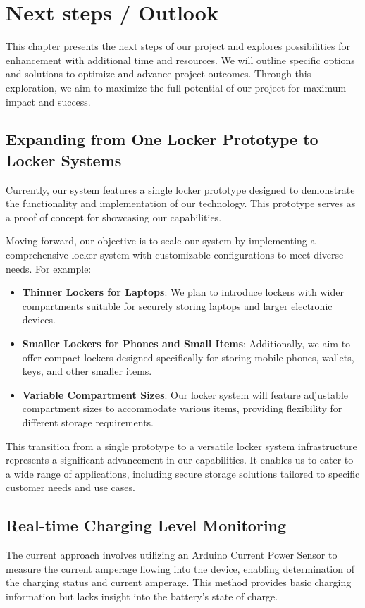 \section{Next steps / Outlook}

This chapter presents the next steps of our project and explores possibilities 
for enhancement with additional time and resources. 
We will outline specific options and solutions to optimize and advance project outcomes. 
Through this exploration, we aim to maximize the full potential of our project 
for maximum impact and success.

\subsection{Expanding from One Locker Prototype to Locker Systems}

Currently, our system features a single locker prototype designed to demonstrate the functionality and implementation of our technology. This prototype serves as a proof of concept for showcasing our capabilities.

Moving forward, our objective is to scale our system by implementing a comprehensive locker system with customizable configurations to meet diverse needs. For example:

\begin{itemize}
    \item \textbf{Thinner Lockers for Laptops}: We plan to introduce lockers with wider compartments suitable for securely storing laptops and larger electronic devices.
    \item \textbf{Smaller Lockers for Phones and Small Items}: Additionally, we aim to offer compact lockers designed specifically for storing mobile phones, wallets, keys, and other smaller items.
    \item \textbf{Variable Compartment Sizes}: Our locker system will feature adjustable compartment sizes to accommodate various items, providing flexibility for different storage requirements.
\end{itemize}

This transition from a single prototype to a versatile locker system infrastructure represents a significant advancement in our capabilities. It enables us to cater to a wide range of applications, including secure storage solutions tailored to specific customer needs and use cases.


\subsection{Real-time Charging Level Monitoring}
The current approach involves utilizing an Arduino Current Power Sensor to measure the
current amperage flowing into the device, 
enabling determination of the charging status and current amperage. 
This method provides basic charging information but lacks insight into the battery's state of charge.

